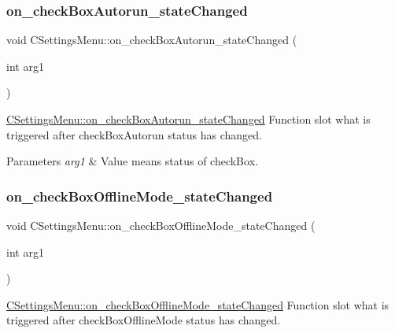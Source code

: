 \subsubsection{\texorpdfstring{on\+\_\+check\+Box\+Autorun\+\_\+state\+Changed}{on\_checkBoxAutorun\_stateChanged}}
{\footnotesize\ttfamily void C\+Settings\+Menu\+::on\+\_\+check\+Box\+Autorun\+\_\+state\+Changed (\begin{DoxyParamCaption}\item[{int}]{arg1 }\end{DoxyParamCaption})\hspace{0.3cm}{\ttfamily [slot]}}



\hyperlink{classCSettingsMenu_ade751a25d60360c8e9931623678f8868}{C\+Settings\+Menu\+::on\+\_\+check\+Box\+Autorun\+\_\+state\+Changed} Function slot what is triggered after check\+Box\+Autorun status has changed. 


\begin{DoxyParams}{Parameters}
{\em arg1} & Value means status of check\+Box. \\
\hline
\end{DoxyParams}
\mbox{\label{classCSettingsMenu_aeb0315c63ec3fdd1b214abb04624f12c}} 
\subsubsection{\texorpdfstring{on\+\_\+check\+Box\+Offline\+Mode\+\_\+state\+Changed}{on\_checkBoxOfflineMode\_stateChanged}}
{\footnotesize\ttfamily void C\+Settings\+Menu\+::on\+\_\+check\+Box\+Offline\+Mode\+\_\+state\+Changed (\begin{DoxyParamCaption}\item[{int}]{arg1 }\end{DoxyParamCaption})\hspace{0.3cm}{\ttfamily [slot]}}



\hyperlink{classCSettingsMenu_aeb0315c63ec3fdd1b214abb04624f12c}{C\+Settings\+Menu\+::on\+\_\+check\+Box\+Offline\+Mode\+\_\+state\+Changed} Function slot what is triggered after check\+Box\+Offline\+Mode status has changed. 


